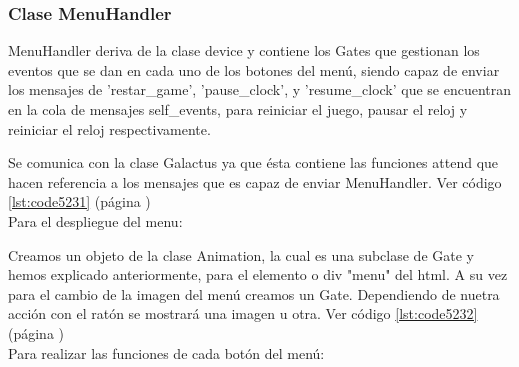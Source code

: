 \subsubsection{Clase MenuHandler}
\label{subsubsection:menu_handler}

MenuHandler deriva de la clase device y contiene los Gates que gestionan los eventos que se dan en  cada uno de los botones del menú, 
siendo capaz de enviar los mensajes de 'restar\_game', 'pause\_clock', y 'resume\_clock' que se encuentran en la cola de mensajes self\_events, 
para reiniciar el juego, pausar el reloj y reiniciar el reloj respectivamente. 

Se comunica con la clase Galactus ya que ésta contiene las funciones attend que hacen referencia a los mensajes que es capaz 
de enviar MenuHandler. Ver código \ref{lst:code5231} (página \pageref{lst:code5231})\\

Para el despliegue del menu:

Creamos un objeto de la clase Animation, la cual es una subclase de Gate y hemos explicado anteriormente, para el elemento o div "menu" del html.
A su vez para el cambio de la imagen del menú creamos un Gate. Dependiendo de nuetra acción con el ratón se mostrará una imagen u otra. 
Ver código \ref{lst:code5232} (página \pageref{lst:code5232})\\

Para realizar las funciones de cada botón del menú:

